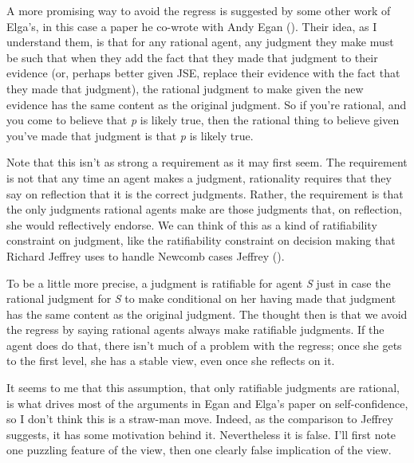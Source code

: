 \documentclass[
  11pt,
  letterpaper,
  DIV=11,
  numbers=noendperiod,
  twoside]{scrartcl}
\begin{document}
A more promising way to avoid the regress is suggested by some other
work of Elga's, in this case a paper he co-wrote with Andy Egan
(). Their idea, as I
understand them, is that for any rational agent, any judgment they make
must be such that when they add the fact that they made that judgment to
their evidence (or, perhaps better given JSE, replace their evidence
with the fact that they made that judgment), the rational judgment to
make given the new evidence has the same content as the original
judgment. So if you're rational, and you come to believe that \emph{p}
is likely true, then the rational thing to believe given you've made
that judgment is that \emph{p} is likely true.

Note that this isn't as strong a requirement as it may first seem. The
requirement is not that any time an agent makes a judgment, rationality
requires that they say on reflection that it is the correct judgments.
Rather, the requirement is that the only judgments rational agents make
are those judgments that, on reflection, she would reflectively endorse.
We can think of this as a kind of ratifiability constraint on judgment,
like the ratifiability constraint on decision making that Richard
Jeffrey uses to handle Newcomb cases Jeffrey
().

To be a little more precise, a judgment is ratifiable for agent \emph{S}
just in case the rational judgment for \emph{S} to make conditional on
her having made that judgment has the same content as the original
judgment. The thought then is that we avoid the regress by saying
rational agents always make ratifiable judgments. If the agent does do
that, there isn't much of a problem with the regress; once she gets to
the first level, she has a stable view, even once she reflects on it.

It seems to me that this assumption, that only ratifiable judgments are
rational, is what drives most of the arguments in Egan and Elga's paper
on self-confidence, so I don't think this is a straw-man move. Indeed,
as the comparison to Jeffrey suggests, it has some motivation behind it.
Nevertheless it is false. I'll first note one puzzling feature of the
view, then one clearly false implication of the view.
\end{document}
